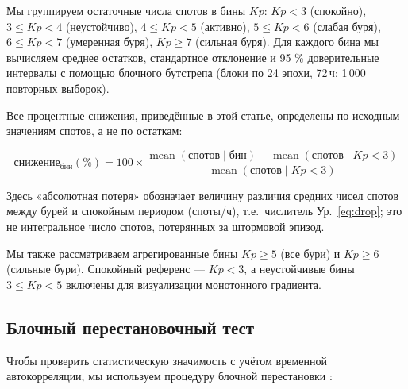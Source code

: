 \documentclass{agujournal2019}
\begin{document}
Мы группируем остаточные числа спотов в бины $Kp$: $Kp < 3$ (спокойно),
$3 \le Kp < 4$ (неустойчиво), $4 \le Kp < 5$ (активно),
$5 \le Kp < 6$ (слабая буря), $6 \le Kp < 7$ (умеренная буря),
$Kp \ge 7$ (сильная буря). Для каждого бина мы вычисляем среднее остатков,
стандартное отклонение и 95 \% доверительные интервалы с помощью блочного
бутстрепа \citep{efron1993} (блоки по 24 эпохи, 72\,ч;
1\,000 повторных выборок).

Все процентные снижения, приведённые в этой статье, определены по исходным
значениям спотов, а не по остаткам:

\begin{equation}
	\mbox{снижение}_{\mbox{бин}}(\%) = 100 \times
	\frac{\operatorname{mean}(\mbox{спотов} \mid \mbox{бин}) -
	\operatorname{mean}(\mbox{спотов} \mid Kp < 3)}{\operatorname{mean}(\mbox{спотов} \mid Kp < 3)}
	\label{eq:drop}
\end{equation}

Здесь «абсолютная потеря» обозначает величину различия средних чисел
спотов между бурей и спокойным периодом (споты/ч), т.е.\ числитель
Ур.~\eqref{eq:drop}; это не интегральное число спотов, потерянных
за штормовой эпизод.

Мы также рассматриваем агрегированные бины $Kp \ge 5$ (все бури) и
$Kp \ge 6$ (сильные бури). Спокойный референс — $Kp < 3$, а неустойчивые
бины $3 \le Kp < 5$ включены для визуализации монотонного градиента.

\subsection{Блочный перестановочный тест}

Чтобы проверить статистическую значимость с учётом временной
автокорреляции, мы используем процедуру блочной перестановки
\citep{davison1997}:
\end{document}
